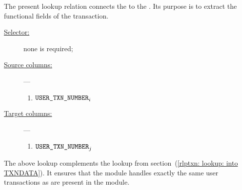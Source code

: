 The present lookup relation connects the \userTxnDataMod{} to the \rlpTxnMod{}. Its purpose is to extract the functional fields of the transaction.
\begin{description}
	\item[\underline{Selector:}]
		none is required;
	\item[\underline{Source columns:}] ---
		\begin{enumerate}
			\item $\texttt{USER}\texttt{\_}\texttt{TXN\_NUMBER} _{i}$
		\end{enumerate}
	\item[\underline{Target columns:}] ---
		\begin{enumerate}
			\item $\texttt{USER}\texttt{\_}\texttt{TXN\_NUMBER} _{j}$
		\end{enumerate}
\end{description}
\saNote{}
The above lookup complements the lookup from
section~(\ref{rlptxn: lookup: into TXNDATA}).
It ensures that the \userTxnDataMod{} module handles exactly
the same user transactions as are present in the \rlpTxnMod{} module.

